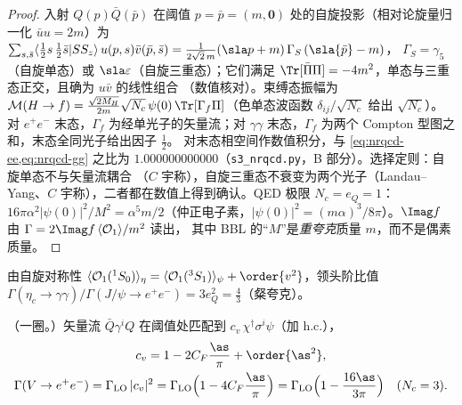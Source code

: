 \begin{proof}
入射 $Q(p)\bar Q(\bar p)$ 在阈值 $p=\bar p=(m,\bm0)$ 处的自旋投影（相对论旋量归一化 $\bar uu=2m$）为
$\sum_{s,\bar s}\langle\frac12s\,\frac12\bar s|SS_z\rangle\,u(p,s)\bar v(\bar p,\bar s)=\frac{1}{2\sqrt2\,m}(\sla p+m)\,\Gamma_S\,(\sla{\bar p}-m)$，
$\Gamma_S=\gamma_5$（自旋单态）或 $\sla\varepsilon$（自旋三重态）；它们满足 $\Tr[\bar\Pi\Pi]=-4m^2$，单态与三重态正交，且确为 $u\bar v$ 的线性组合
（数值核对）。束缚态振幅为 $\mathcal M(H\to f)=\frac{\sqrt{2M_H}}{2m}\sqrt{N_c}\,\psi(0)\,\Tr[\Gamma_f\Pi]$（色单态波函数 $\delta_{ij}/\sqrt{N_c}$
给出 $\sqrt{N_c}$）。对 $e^+e^-$ 末态，$\Gamma_f$ 为经单光子的矢量流；对 $\gamma\gamma$ 末态，$\Gamma_f$ 为两个 Compton 型图之和，末态全同光子给出因子 $\frac12$。
对末态相空间作数值积分，与 \cref{eq:nrqcd-ee,eq:nrqcd-gg} 之比为 $1.000000000000$（\texttt{s3\_\allowbreak nrqcd.py}，B 部分）。选择定则：自旋单态不与矢量流耦合
（$C$ 宇称），自旋三重态不衰变为两个光子（Landau--Yang、$C$ 宇称），二者都在数值上得到确认。QED 极限 $N_c=e_Q=1$：
$16\pi\alpha^2|\psi(0)|^2/M^2=\alpha^5m/2$（仲正电子素，$|\psi(0)|^2=(m\alpha)^3/8\pi$）。$\Imag f$ 由 $\Gamma=2\Imag f\,\langle\mathcal O_1\rangle/m^2$ 读出，
其中 BBL 的“$M$”是\emph{重夸克}质量 $m$，而不是偶素质量。
\end{proof}

由自旋对称性 $\langle\mathcal O_1(^1S_0)\rangle_{\eta}=\langle\mathcal O_1(^3S_1)\rangle_{\psi}+\order{v^2}$，领头阶比值
$\Gamma(\eta_c\to\gamma\gamma)/\Gamma(J/\psi\to e^+e^-)=3e_Q^2=\frac43$（粲夸克）。

\begin{proposition}[矢量流的一圈匹配]\tagR\label{prop:nrqcd-cv}
（一圈。）矢量流 $\bar Q\gamma^iQ$ 在阈值处匹配到 $c_v\,\chi^\dagger\sigma^i\psi$（加 h.c.），
\begin{equation}\label{eq:nrqcd-cv}
\begin{gathered}
c_v=1-2C_F\frac{\as}{\pi}+\order{\as^2},\\
\Gamma(V\to e^+e^-)=\Gamma_{\rm LO}\,|c_v|^2=\Gamma_{\rm LO}\Big(1-4C_F\frac{\as}{\pi}\Big)=\Gamma_{\rm LO}\Big(1-\frac{16\as}{3\pi}\Big)\quad(N_c=3).
\end{gathered}
\end{equation}
\end{proposition}

